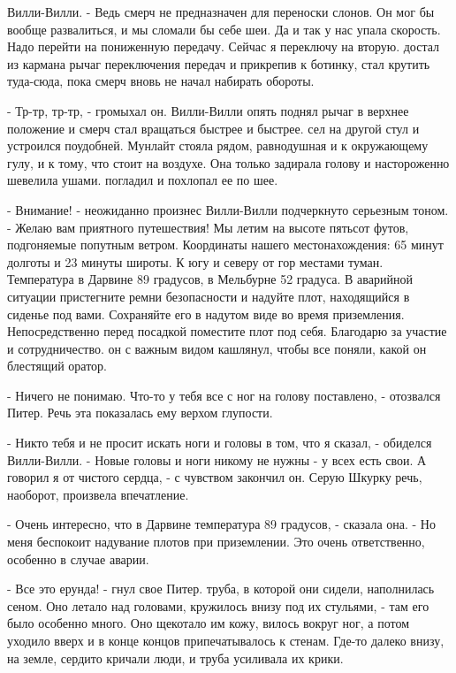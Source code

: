 Вилли-Вилли. - Ведь смерч не предназначен для переноски слонов. Он мог 
бы вообще развалиться, и мы сломали бы себе шеи. Да и так у нас упала 
скорость. Надо перейти на пониженную передачу. Сейчас я переключу на 
вторую.
 достал из кармана рычаг переключения передач и прикрепив к 
ботинку, стал крутить туда-сюда, пока смерч вновь не начал набирать 
обороты.
\par- Тр-тр, тр-тр, - громыхал он. Вилли-Вилли опять поднял рычаг в 
верхнее положение и смерч стал вращаться быстрее и быстрее.
 сел на другой стул и устроился поудобней. Мунлайт стояла 
рядом, равнодушная и к окружающему гулу, и к тому, что стоит на 
воздухе. Она только задирала голову и настороженно шевелила ушами.
 погладил и похлопал ее по шее.
\par- Внимание! - неожиданно произнес Вилли-Вилли подчеркнуто 
серьезным тоном. - Желаю вам приятного путешествия! Мы летим на высоте 
пятьсот футов, подгоняемые попутным ветром. Координаты нашего 
местонахождения: 65 минут долготы и 23 минуты широты. К югу и северу 
от гор местами туман. Температура в Дарвине 89 градусов, в Мельбурне 
52 градуса. В аварийной ситуации пристегните ремни безопасности и 
надуйте плот, находящийся в сиденье под вами. Сохраняйте его в надутом 
виде во время приземления. Непосредственно перед посадкой поместите 
плот под себя. Благодарю за участие и сотрудничество.
 он с важным видом кашлянул, чтобы все поняли, какой он 
блестящий оратор.
\par- Ничего не понимаю. Что-то у тебя все с ног на голову поставлено, 
- отозвался Питер. Речь эта показалась ему верхом глупости.
\par- Никто тебя и не просит искать ноги и головы в том, что я сказал, 
- обиделся Вилли-Вилли. - Новые головы и ноги никому не нужны - у всех 
есть свои. А говорил я от чистого сердца, - с чувством закончил он.
 Серую Шкурку речь, наоборот, произвела впечатление.
\par- Очень интересно, что в Дарвине температура 89 градусов, - 
сказала она. - Но меня беспокоит надувание плотов при приземлении. Это 
очень ответственно, особенно в случае аварии.
\par- Все это ерунда! - гнул свое Питер.
 труба, в которой они сидели, наполнилась сеном. Оно 
летало над головами, кружилось внизу под их стульями, - там его было 
особенно много. Оно щекотало им кожу, вилось вокруг ног, а потом 
уходило вверх и в конце концов припечатывалось к стенам. Где-то далеко 
внизу, на земле, сердито кричали люди, и труба усиливала их крики.
